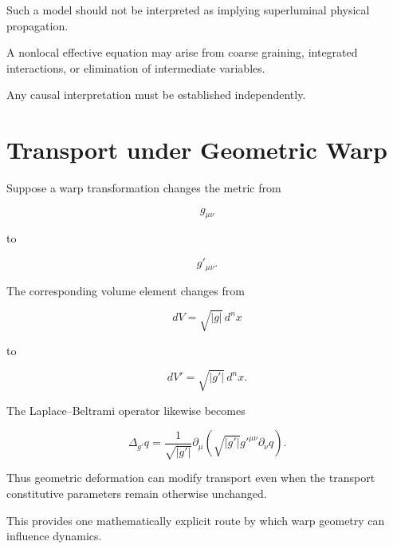 \documentclass[12pt,oneside]{book}
\begin{document}
Such a model should not be interpreted as implying
superluminal physical propagation.

A nonlocal effective equation may arise from coarse graining,
integrated interactions, or elimination of intermediate
variables.

Any causal interpretation must be established independently.


\section{Transport under Geometric Warp}
\label{sec:transport-warp}

Suppose a warp transformation changes the metric from

\begin{equation}
    g_{\mu\nu}
\end{equation}

to

\begin{equation}
    g'_{\mu\nu}.
\end{equation}

The corresponding volume element changes from

\begin{equation}
    dV
    =
    \sqrt{|g|}
    \,d^n x
\end{equation}

to

\begin{equation}
    dV'
    =
    \sqrt{|g'|}
    \,d^n x.
    \label{eq:warped-volume-element}
\end{equation}

The Laplace--Beltrami operator likewise becomes

\begin{equation}
    \Delta_{g'}q
    =
    \frac{1}{\sqrt{|g'|}}
    \partial_\mu
    \left(
        \sqrt{|g'|}
        g'^{\mu\nu}
        \partial_\nu q
    \right).
    \label{eq:warped-laplace-beltrami}
\end{equation}

Thus geometric deformation can modify transport even when the
transport constitutive parameters remain otherwise unchanged.

This provides one mathematically explicit route by which warp
geometry can influence dynamics.
\end{document}
